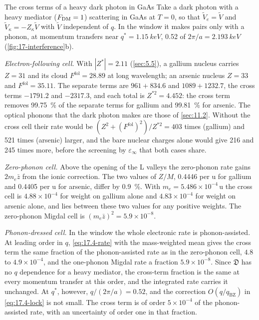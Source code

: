 \begin{workedexample}{The cross terms of a heavy dark photon in GaAs}\label{we:17-gaas-interference}
Take a dark photon with a heavy mediator ($F_{\mathrm{DM}} = 1$) scattering in GaAs at $T = 0$, so that $\tilde V_e = \tilde V$ and $\tilde V_\kappa = -Z_\kappa\tilde V$ with $\tilde V$ independent of $q$. In the window it makes pairs only with a phonon, at momentum transfers near $q^* = \SI{1.15}{keV}$, 0.52 of $2\pi/a = \SI{2.193}{keV}$ (\cref{fig:17-interference}b).

\emph{Electron-following cell.} With $|Z^*| = 2.11$ (\cref{sec:5.5}), a gallium nucleus carries $Z = 31$ and its cloud $F^{\mathrm{fol}} = 28.89$ at long wavelength; an arsenic nucleus $Z = 33$ and $F^{\mathrm{fol}} = 35.11$. The separate terms are $961 + 834.6$ and $1089 + 1232.7$, the cross terms $-1791.2$ and $-2317.3$, and each total is $Z^{*2} = 4.452$: the cross term removes \SI{99.75}{\percent} of the separate terms for gallium and \SI{99.81}{\percent} for arsenic. The optical phonons that the dark photon makes are those of \cref{sec:11.2}. Without the cross cell their rate would be $(Z^2 + (F^{\mathrm{fol}})^2)/Z^{*2} = 403$ times (gallium) and 521 times (arsenic) larger, and the bare nuclear charges alone would give 216 and 245 times more, before the screening by $\varepsilon_\infty$ that both cases share.

\emph{Zero-phonon cell.} Above the opening of the L valleys the zero-phonon rate gains $2m_e\bar z$ from the ionic correction. The two values of $Z/M$, 0.4446 per u for gallium and 0.4405 per u for arsenic, differ by \SI{0.9}{\percent}. With $m_e = 5.486\times10^{-4}$\,u the cross cell is $4.88\times10^{-4}$ for weight on gallium alone and $4.83\times10^{-4}$ for weight on arsenic alone, and lies between these two values for any positive weights. The zero-phonon Migdal cell is $(m_e\bar z)^2 = 5.9\times10^{-8}$.

\emph{Phonon-dressed cell.} In the window the whole electronic rate is phonon-assisted. At leading order in $q$, \cref{eq:17.4-rate} with the mass-weighted mean gives the cross term the same fraction of the phonon-assisted rate as in the zero-phonon cell, $4.8$ to $4.9\times10^{-4}$, and the one-phonon Migdal rate a fraction $5.9\times10^{-8}$. Since $\mathfrak{D}$ has no $q$ dependence for a heavy mediator, the cross-term fraction is the same at every momentum transfer at this order, and the integrated rate carries it unchanged. At $q^*$, however, $q/(2\pi/a) = 0.52$, and the correction $O(q/q_{\mathrm{BZ}})$ in \cref{eq:17.4-lock} is not small. The cross term is of order $5\times10^{-4}$ of the phonon-assisted rate, with an uncertainty of order one in that fraction.


\end{workedexample}
